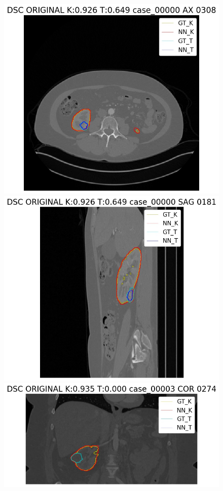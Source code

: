 \documentclass{article}
\begin{document}
\begin{figure}[h]
    \centering
    \includegraphics[totalheight=.20\textheight]{imgs/ex1.jpg}
    \includegraphics[totalheight=.20\textheight]{imgs/ex2.jpg}
    \newline
    \includegraphics[totalheight=.15\textheight]{imgs/ex3.jpg}

\end{figure}
\end{document}
